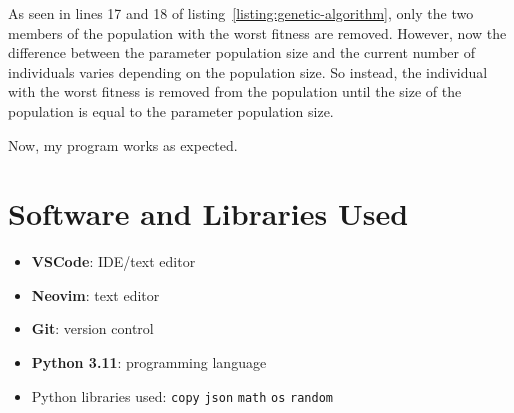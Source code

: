 As seen in lines 17 and 18 of listing~\ref*{listing:genetic-algorithm}, only the
two members of the population with the worst fitness are removed.
However, now the difference between the parameter population size and the 
current number of individuals varies depending on the population size.
So instead, the individual with the worst fitness is removed from the population
until the size of the population is equal to the parameter population size.

Now, my program works as expected.

\newpage

\section{Software and Libraries Used}

\begin{itemize}
	\item \textbf{VSCode}: IDE/text editor
	\item \textbf{Neovim}: text editor
	\item \textbf{Git}: version control
	\item \textbf{Python 3.11}: programming language
	\item Python libraries used:
	\subitem \verb|copy|
	\subitem \verb|json|
	\subitem \verb|math|
	\subitem \verb|os|
	\subitem \verb|random|
\end{itemize}